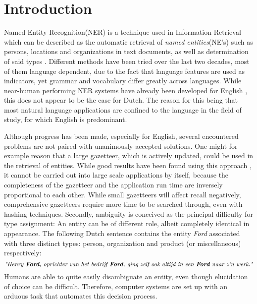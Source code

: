 \section{Introduction} \label{sec:intro}
Named Entity Recognition(NER) is a technique used in Information Retrieval which can be described as the automatic retrieval of \emph{named entities}(NE's) such as persons, locations and organizations in text documents, as well as determination of said types \cite{tjong2003introduction}. Different methods have been tried over the last two decades, most of them language dependent, due to the fact that language features are used as indicators, yet grammar and vocabulary differ greatly across languages. While near-human performing NER systems have already been developed for English \cite{ratinov2009design} \cite{chieu2002named} , this does not appear to be the case for Dutch. The reason for this being that most natural language applications are confined to the language in the field of study, for which English is predominant.  

Although progress has been made, especially for English, several encountered problems are not paired with unanimously accepted solutions. 
One might for example reason that a large gazetteer, which is actively updated, could be used in the retrieval of entities. While good results have been found using this approach \cite{nadeau2006unsupervised}, it cannot be carried out into large scale applications by itself, because the completeness of the gazetteer and the application run time are inversely proportional to each other. While small gazetteers will affect recall negatively, comprehensive gazetteers require more time to be searched through, even with hashing techniques. 
Secondly, ambiguity is conceived as the principal difficulty for type assignment: An entity can be of different role, albeit completely identical in appearance. The following Dutch sentence contains the entity \emph{Ford} associated with three distinct types: person, organization and product (or miscellaneous) respectively:
$$\textit{"Henry \textbf{Ford}, oprichter van het bedrijf \textbf{Ford}, ging zelf ook altijd in een \textbf{Ford} naar z'n werk."}$$  Humans are able to quite easily disambiguate an entity, even though elucidation of choice can be difficult. Therefore, computer systems are set up with an arduous task that automates this decision process.

